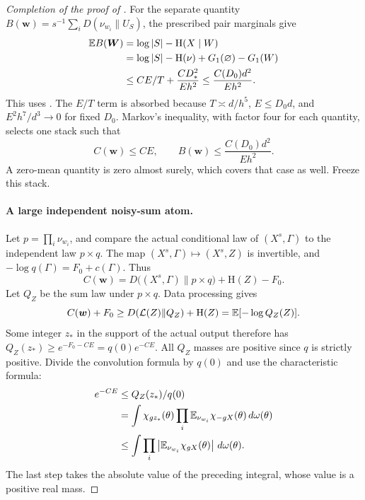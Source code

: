 \begin{proof}[Completion of the proof of ]
For the separate quantity
$B(\boldsymbol w)=s^{-1}\sum_iD(\nu_{w_i}\|U_S)$, the prescribed pair
marginals give
\begin{equation}
 \begin{split}
 \mathbb E B(\boldsymbol W)
 &=\log|S|-\mathrm H(X\mid W)\\
 &=\log|S|-\mathrm H(\nu)+G_1(\varnothing)-G_1(W)\\
 &\le CE/T+\frac{CD_*^2}{Eh^2}
 \le\frac{C(D_0)d^2}{Eh^2}.
 \end{split}
 \label{entropy-refinement:frozen-divergence}
\end{equation}
This uses .
The $E/T$ term is absorbed because $T\asymp d/h^5$, $E\le D_0d$, and
$E^2h^7/d^3\to0$ for fixed $D_0$.
Markov's inequality, with factor four for each quantity, selects one stack
such that
\begin{equation}
 C(\boldsymbol w)\le CE,\qquad
 B(\boldsymbol w)\le\frac{C(D_0)d^2}{Eh^2}.
 \label{entropy-refinement:chosen-stack}
\end{equation}
A zero-mean quantity is zero almost surely, which covers that case as well.
Freeze this stack.

\paragraph{A large independent noisy-sum atom.}
Let $p=\prod_i\nu_{w_i}$, and compare the actual conditional law of
$(X^s,\Gamma)$ to the independent law $p\times q$.
The map $(X^s,\Gamma)\mapsto(X^s,Z)$ is invertible, and
$-\log q(\Gamma)=F_0+c(\Gamma)$. Thus
\begin{equation}
 C(\boldsymbol w)=D\bigl((X^s,\Gamma)\|p\times q\bigr)
                   +\mathrm H(Z)-F_0.
 \label{entropy-refinement:noisy-identity}
\end{equation}
Let $Q_Z$ be the sum law under $p\times q$. Data processing gives
\[
 C(\boldsymbol w)+F_0
 \ge D(\mathcal L(Z)\|Q_Z)+\mathrm H(Z)
 =\mathbb E[-\log Q_Z(Z)].
\]
Some integer $z_*$ in the support of the actual output therefore has
$Q_Z(z_*)\ge e^{-F_0-CE}=q(0)e^{-CE}$.
All $Q_Z$ masses are positive since $q$ is strictly positive.
Divide the convolution formula by $q(0)$ and use the characteristic formula:
\begin{equation}
 \begin{split}
 e^{-CE}
 &\le Q_Z(z_*)/q(0)\\
 &=\int\chi_{gz_*}(\theta)
       \prod_i\mathbb E_{\nu_{w_i}}\chi_{-gX}(\theta)\,d\omega(\theta)\\
 &\le\int\prod_i
       \left|\mathbb E_{\nu_{w_i}}\chi_{gX}(\theta)\right|\,d\omega(\theta).
 \end{split}
 \label{entropy-refinement:phase-product}
\end{equation}
The last step takes the absolute value of the preceding integral, whose
value is a positive real mass.


\end{proof}
